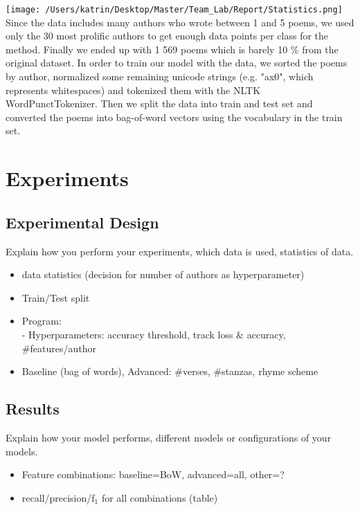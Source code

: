 \documentclass[11pt]{article}
\begin{document}
\texttt{[image: /Users/katrin/Desktop/Master/Team\_Lab/Report/Statistics.png]}
\\

Since the data includes many authors who wrote between 1 and 5 poems, we used only the 30 most prolific authors to get enough data points per class for the method. Finally we ended up with 1 569 poems which is barely 10 \% from the original dataset.
In order to train our model with the data, we sorted the poems by author, normalized some remaining unicode strings (e.g. "ax0", which represents whitespaces) and tokenized them with the NLTK WordPunctTokenizer. Then we split the data into train and test set and converted the poems into bag-of-word vectors using the vocabulary in the train set.


\section{Experiments}

\subsection{Experimental Design}

Explain how you perform your experiments, which data is used, statistics of data.
\begin{itemize}
\item data statistics (decision for number of authors as hyperparameter)
\item Train/Test split
\item Program:\\
- Hyperparameters: accuracy threshold, track loss \& accuracy, \#{}features/author
\item Baseline (bag of words), Advanced: \#{}verses, \#{}stanzas, rhyme scheme
\end{itemize}

\subsection{Results}
Explain how your model performs, different models or configurations of your models.
\begin{itemize}
\item Feature combinations: baseline=BoW, advanced=all, other=?
\item recall/precision/f$_1$ for all combinations (table)
\end{itemize}
\end{document}
